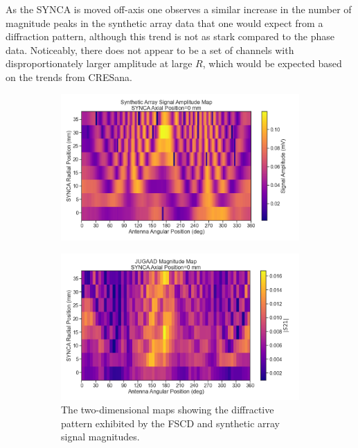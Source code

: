 As the SYNCA is moved off-axis one observes a similar increase in the number of magnitude peaks in the synthetic array data that one would expect from a diffraction pattern, although this trend is not as stark compared to the phase data. Noticeably, there does not appear to be a set of channels with disproportionately larger amplitude at large $R$, which would be expected based on the trends from CRESana. 

\begin{figure}[htbp]
\centering
\begin{subfigure}{.75\textwidth}
  \centering
  \includegraphics[width=1\textwidth]{figs/Chapter-5/230120_synth_array_signal_amplitude_map_z0.png}
  \caption{}
  \label{fig:synth-jugaad-mag-map}
\end{subfigure}
\par\medskip %
\begin{subfigure}{.75\textwidth}
  \centering
  \includegraphics[width=1\textwidth]{figs/Chapter-5/230123_jugaad_magnitude_map_z0.png}
  \caption{The two-dimensional maps showing the diffractive pattern exhibited by the FSCD and synthetic array signal magnitudes.}
  \label{fig:jugaad-mag-map}
\end{subfigure}
\caption{}
\label{fig:measured-mag-map-comp-jugaad}
\end{figure}

